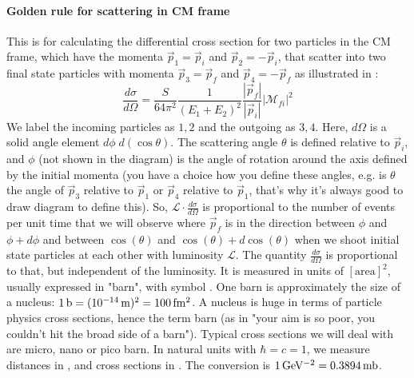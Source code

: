 \paragraph{Golden rule for scattering in CM frame}
This is for calculating the differential cross section for two particles in the CM frame, which have the momenta $\vec{p}_1 = \vec{p}_i$ and $\vec{p}_2 = -\vec{p}_i$, that scatter into two final state particles with momenta $\vec{p}_3 = \vec{p}_f$ and $\vec{p}_4 = -\vec{p}_f$ as illustrated in :
\begin{equation}
\frac{d \sigma}{d\Omega}= \frac{S}{64\pi^2} \frac{1}{(E_1 + E_2)^2} \frac{|\vec{p}_f|}{|\vec{p}_i|} \left|\mathcal{M}_{fi}\right|^2
\end{equation}
We label the incoming particles as $1, 2$ and the outgoing as $3, 4$.
Here, $d\Omega$ is a solid angle element $d\phi\; d(\cos\theta)$. The scattering angle $\theta$ is defined relative to $\vec{p}_i$, and $\phi$ (not shown in the diagram) is the angle of rotation around the axis defined by the initial momenta (you have a choice how you define these angles, e.g. is $\theta$ the angle of $\vec{p}_3$ relative to $\vec{p}_1$ or $\vec{p}_4$ relative to $\vec{p}_1$, that's why it's always good to draw  diagram to define this). So, $\mathcal{L} \cdot \frac{d \sigma}{d\Omega}$ is proportional to the number of events per unit time that we will observe where $\vec{p}_f$ is in the direction between $\phi$ and $\phi + d\phi$ and between $\cos(\theta)$ and $\cos(\theta) + d\cos(\theta)$ when we shoot initial state particles at each other with luminosity $\mathcal{L}$. The quantity $\frac{d \sigma}{d\Omega}$ is proportional to that, but independent of the luminosity. It is measured in units of $[\mathrm{area}]^2$, usually expressed in "barn", with symbol . One barn is approximately the size of a nucleus: $1\,\mathrm{b} = (10^{-14}\,\mathrm{m})^2 = 100\,\mathrm{fm^2}$. A nucleus is huge in terms of particle physics cross sections, hence the term barn (as in "your aim is so poor, you couldn't hit the broad side of a barn"). Typical cross sections we will deal with are micro, nano or pico barn. In natural units with $\hbar=c=1$, we measure distances in , and cross sections in . The conversion is $1\,\mathrm{GeV^{-2}} = 0.3894\,\mathrm{mb}$.

